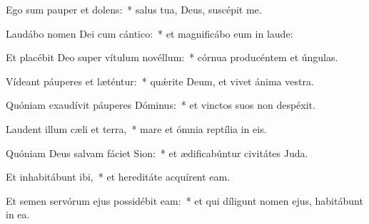 \item Ego sum pauper et dolens:~* salus tua, Deus, suscépit me.

\item Laudábo nomen Dei cum cántico:~* et magnificábo eum in laude:

\item Et placébit Deo super vítulum novéllum:~* córnua producéntem et úngulas.

\item Vídeant páuperes et læténtur:~* quǽrite Deum, et vivet ánima vestra.

\item Quóniam exaudívit páuperes Dóminus:~* et vinctos suos non despéxit.

\item Laudent illum cæli et terra,~* mare et ómnia reptília in eis.

\item Quóniam Deus salvam fáciet Sion:~* et ædificabúntur civitátes Juda.

\item Et inhabitábunt ibi,~* et hereditáte acquírent eam.

\item Et semen servórum ejus possidébit eam:~* et qui díligunt nomen ejus, habitábunt in ea.

